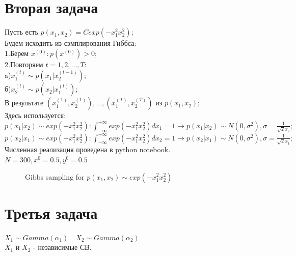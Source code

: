 \documentclass{article}
\begin{document}
\section{Вторая задача}
Пусть есть $p(x_1,x_2) = Cexp(-x_1^2x_2^2);$\\
Будем исходить из сэмплирования Гиббса:\\
1.Берем $x^{(0)}:p(x^{(0)}) > 0;$\\
2.Повторяем $t = 1,2,...,T:$\\
a)$x_1^{(t)} \sim p(x_1|x_2^{(t-1)});$\\
б)$x_2^{(t)} \sim p(x_2|x_1^{(t)});$\\
В результате $(x_1^{(1)}, x_2^{(1)}),...,(x_1^{(T)}, x_2^{(T)})$ из $p(x_1,x_2);$\\
Здесь используется:\\
$p(x_1|x_2) \sim exp(-x_1^2x_2^2):\int_{-\infty}^{+\infty} exp(-x_1^2x_2^2)dx_1 = 1 \to p(x_1|x_2) \sim N(0,\sigma^2), \sigma = \frac{1}{\sqrt{2}x_2};$\\
$p(x_2|x_1) \sim exp(-x_1^2x_2^2):\int_{-\infty}^{+\infty} exp(-x_1^2x_2^2)dx_2 = 1 \to p(x_2|x_1) \sim N(0, \sigma^2), \sigma = \frac{1}{\sqrt{2}x_1};$\\
Численная реализация проведена в python notebook.\\
$N = 300, x^{0} = 0.5, y^{0} = 0.5$
\begin{figure}[h]
\caption{Gibbs sampling for $p(x_1, x_2) \sim exp(-x_1^2x_2^2)$}
\label{ris:image}
\end{figure}



\section{Третья задача}
$X_1 \sim Gamma(\alpha_1) \quad X_2 \sim Gamma(\alpha_2)$\\
$X_1$ и $X_2$ - независимые СВ.\\
\end{document}
